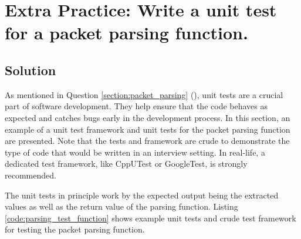 \documentclass[main.tex]{subfiles}
\begin{document}
\section{Extra Practice: Write a unit test for a packet parsing function.} \label{extra_practice:packet_parsing_tests}

\spoilerline

\subsection{Solution}
\noindent As mentioned in Question \ref{section:packet_parsing} (\textit{}), unit tests are a crucial part of software development. They help ensure that the code behaves as expected and catches bugs early in the development process. In this section, an example of a unit test framework and unit tests for the packet parsing function are presented. Note that the tests and framework are crude to demonstrate the type of code that would be written in an interview setting. In real-life, a dedicated test framework, like CppUTest or GoogleTest, is strongly recommended. \newline

\newnoindentpara The unit tests in principle work by the expected output being the extracted values as well as the return value of the parsing function. Listing \ref{code:parsing_test_function} shows example unit tests and crude test framework for testing the packet parsing function.


\end{document}
